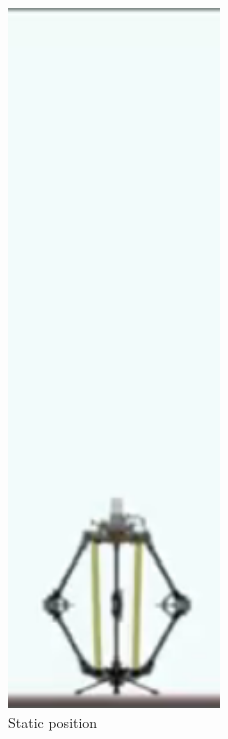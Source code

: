 \begin{figure}[H]
    \centering
    \begin{minipage}[b]{0.2\textwidth}
        \centering
        \includegraphics[width=0.5\textwidth]{daedalus-jumper-1.png}
        \caption*{Static position}
    \end{minipage}
    \hspace{0.02\textwidth}
    \begin{minipage}[b]{0.2\textwidth}
        \centering

\end{minipage}
\end{figure}
